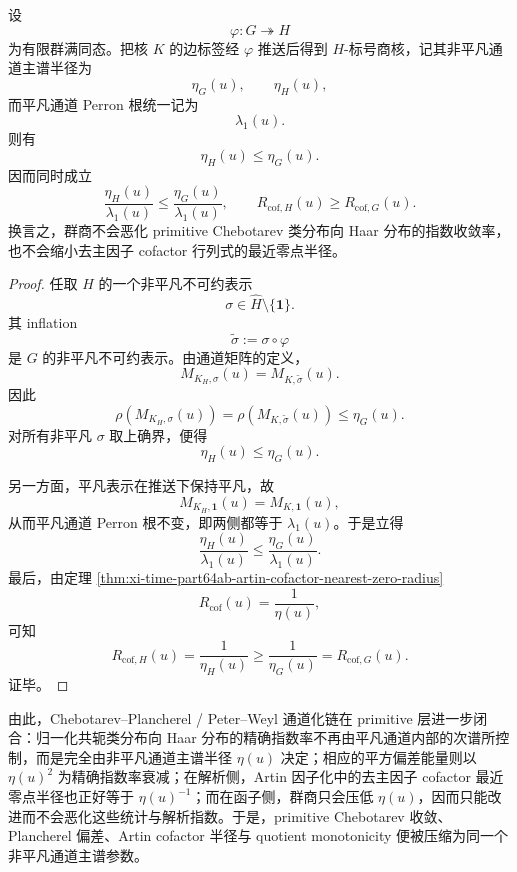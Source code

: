 \begin{theorem}\label{thm:xi-time-part64ab-quotient-monotonicity-error-exponent}
设
\[
\varphi:G\twoheadrightarrow H
\]
为有限群满同态。把核 \(K\) 的边标签经 \(\varphi\) 推送后得到 \(H\)-标号商核，记其非平凡通道主谱半径为
\[
\eta_G(u),\qquad \eta_H(u),
\]
而平凡通道 Perron 根统一记为
\[
\lambda_1(u).
\]
则有
\[
\boxed{\;
\eta_H(u)\le \eta_G(u).\;}
\]
因而同时成立
\[
\boxed{\;
\frac{\eta_H(u)}{\lambda_1(u)}
\le
\frac{\eta_G(u)}{\lambda_1(u)},
\qquad
R_{\mathrm{cof},H}(u)\ge R_{\mathrm{cof},G}(u).\;}
\]
换言之，群商不会恶化 primitive Chebotarev 类分布向 Haar 分布的指数收敛率，也不会缩小去主因子 cofactor 行列式的最近零点半径。
\end{theorem}
\begin{proof}
任取 \(H\) 的一个非平凡不可约表示
\[
\sigma\in\widehat H\setminus\{\mathbf 1\}.
\]
其 inflation
\[
\widetilde\sigma:=\sigma\circ\varphi
\]
是 \(G\) 的非平凡不可约表示。由通道矩阵的定义，
\[
M_{K_H,\sigma}(u)=M_{K,\widetilde\sigma}(u).
\]
因此
\[
\rho(M_{K_H,\sigma}(u))
=
\rho(M_{K,\widetilde\sigma}(u))
\le
\eta_G(u).
\]
对所有非平凡 \(\sigma\) 取上确界，便得
\[
\eta_H(u)\le \eta_G(u).
\]

另一方面，平凡表示在推送下保持平凡，故
\[
M_{K_H,\mathbf 1}(u)=M_{K,\mathbf 1}(u),
\]
从而平凡通道 Perron 根不变，即两侧都等于 \(\lambda_1(u)\)。于是立得
\[
\frac{\eta_H(u)}{\lambda_1(u)}
\le
\frac{\eta_G(u)}{\lambda_1(u)}.
\]
最后，由定理 \ref{thm:xi-time-part64ab-artin-cofactor-nearest-zero-radius}
\[
R_{\mathrm{cof}}(u)=\frac{1}{\eta(u)},
\]
可知
\[
R_{\mathrm{cof},H}(u)=\frac{1}{\eta_H(u)}
\ge
\frac{1}{\eta_G(u)}
=
R_{\mathrm{cof},G}(u).
\]
证毕。
\end{proof}

\noindent
由此，Chebotarev--Plancherel / Peter--Weyl 通道化链在 primitive 层进一步闭合：归一化共轭类分布向 Haar 分布的精确指数率不再由平凡通道内部的次谱所控制，而是完全由非平凡通道主谱半径 \(\eta(u)\) 决定；相应的平方偏差能量则以 \(\eta(u)^2\) 为精确指数率衰减；在解析侧，Artin 因子化中的去主因子 cofactor 最近零点半径也正好等于 \(\eta(u)^{-1}\)；而在函子侧，群商只会压低 \(\eta(u)\)，因而只能改进而不会恶化这些统计与解析指数。于是，primitive Chebotarev 收敛、Plancherel 偏差、Artin cofactor 半径与 quotient monotonicity 便被压缩为同一个非平凡通道主谱参数。

\endinput
